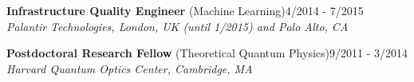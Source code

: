 \documentclass[10pt,centered]{./res} %
\begin{document}
\begin{resume}
{\bf Infrastructure Quality Engineer} (Machine Learning)\hfill4/2014 - 7/2015 \\
{\it Palantir Technologies, London, UK (until 1/2015) and Palo Alto, CA}

{\bf Postdoctoral Research Fellow} (Theoretical Quantum Physics)\hfill 9/2011 - 3/2014 \\
{\it Harvard Quantum Optics Center, Cambridge, MA}


\end{resume}
\end{document}
